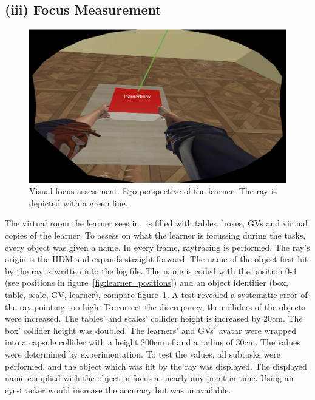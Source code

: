 \subsection{(iii) Focus Measurement}
\label{sec:rayTrace}
\begin{figure}[H]
	\centering
	\includegraphics[width=\textwidth]{figures/focus.png}
	\caption[Focus assessment]{Visual focus assessment. Ego perspective of the learner. The ray is depicted with a green line.}
	\label{fig:focusAssessment}
\end{figure}
The virtual room the learner sees in \exgo\ is filled with tables, boxes, GVs and virtual copies of the learner. To assess on what the learner is focussing during the tasks, every object was given a name. In every frame, raytracing is performed. The ray's origin is the HDM and expands straight forward. The name of the object first hit by the ray is written into the log file. The name is coded with the position 0-4 (see positions in figure~\ref{fig:learner_positions}) and an object identifier (box, table, scale, GV, learner), compare figure~\ref{fig:focusAssessment}. A test revealed a systematic error of the ray pointing too high. To correct the discrepancy, the colliders of the objects were increased. The tables' and scales' collider height is increased by 20cm. The box' collider height was doubled. The learners' and GVs' avatar were wrapped into a capsule collider with a height 200cm of and a radius of 30cm. The values were determined by experimentation. To test the values, all subtasks were performed, and the object which was hit by the ray was displayed. The displayed name complied with the object in focus at nearly any point in time. Using an eye-tracker would increase the accuracy but was unavailable.


